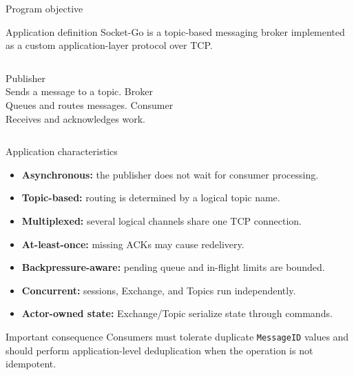 \documentclass[aspectratio=169,10pt]{beamer}
\newcommand{\blue}[1]{\textcolor{SGBlue}{#1}}
\newcommand{\code}[1]{\texttt{\small #1}}
\begin{document}
\begin{frame}{Program objective}
  \begin{block}{Application definition}
    Socket-Go is a topic-based messaging broker implemented as a custom
    application-layer protocol over TCP.
  \end{block}
  \vspace{.35em}
  \begin{columns}[T,onlytextwidth]
      \centering\blue{Publisher}\\[.35em]
      \small Sends a message to a topic.
      \centering\blue{Broker}\\[.35em]
      \small Queues and routes messages.
      \centering\blue{Consumer}\\[.35em]
      \small Receives and acknowledges work.
  \end{columns}
  \vspace{.8em}
  \begin{center}
  \end{center}
\end{frame}

\begin{frame}{Application characteristics}
  \begin{itemize}
    \item \textbf{Asynchronous:} the publisher does not wait for consumer processing.
    \item \textbf{Topic-based:} routing is determined by a logical topic name.
    \item \textbf{Multiplexed:} several logical channels share one TCP connection.
    \item \textbf{At-least-once:} missing ACKs may cause redelivery.
    \item \textbf{Backpressure-aware:} pending queue and in-flight limits are bounded.
    \item \textbf{Concurrent:} sessions, Exchange, and Topics run independently.
    \item \textbf{Actor-owned state:} Exchange/Topic serialize state through commands.
  \end{itemize}
  \vspace{.45em}
  \begin{alertblock}{Important consequence}
    Consumers must tolerate duplicate \code{MessageID} values and should perform
    application-level deduplication when the operation is not idempotent.
  \end{alertblock}
\end{frame}
\end{document}

